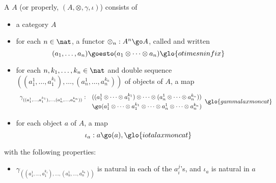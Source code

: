 \begin{defn}	
A  $A$ (or properly, $(A, \otimes,
\gamma, \iota)$) consists of 
%
\begin{itemize}
\item a category $A$
\item for each $n\in \nat$, a functor $\otimes_n: A^n \go A$,%
% 
%  
called  and written
\[
(a_1, \ldots, a_n) \goesto (a_1 \otimes \cdots \otimes a_n)
% 
\glo{otimesninfix}
%
\]
% 
\item for each $n, k_1, \ldots, k_n \in \nat$ and double sequence $((a_1^1,
\ldots, a_1^{k_1}), \ldots, (a_n^1, \ldots, a_n^{k_n}))$ of objects of $A$,
a map
\[
\begin{array}{rl}
\gamma_{((a_1^1, \ldots, a_1^{k_1}), \ldots, (a_n^1, \ldots,
a_n^{k_n}))}:&
((a_1^1 \otimes \cdots \otimes a_1^{k_1}) \otimes \cdots \otimes
(a_n^1 \otimes \cdots \otimes a_n^{k_n}))\\
&\go
(a_1^1 \otimes\cdots\otimes a_1^{k_1} \otimes\cdots\otimes a_n^1
\otimes\cdots\otimes a_n^{k_n})
\end{array}
% 
\glo{gammalaxmoncat}
% 
\]
\item for each object $a$ of $A$, a map
\[
\iota_a: a \go (a),
% 
\glo{iotalaxmoncat}
% 
\]
\end{itemize}
%
with the following properties:
%
\begin{itemize}
\item
$\gamma_{((a_1^1, \ldots, a_1^{k_1}), \ldots, (a_n^1, \ldots,
a_n^{k_n}))}$ is natural in each of the $a_i^j$'s, and $\iota_a$ is natural
in $a$


\end{itemize}
\end{defn}
